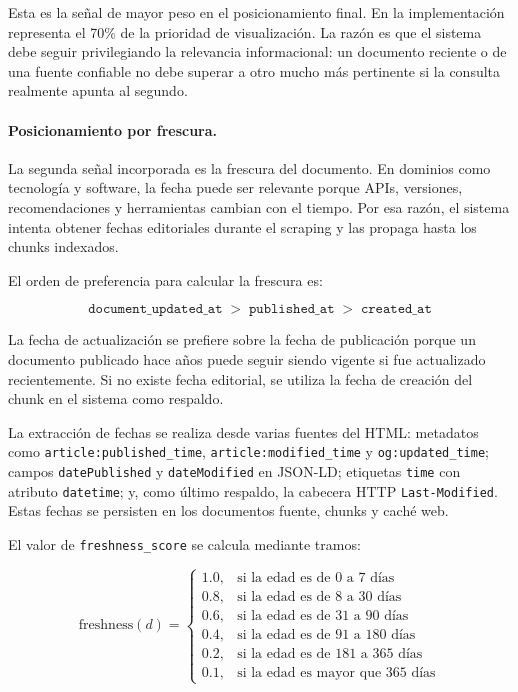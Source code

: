 \documentclass[11pt]{article}
\begin{document}
Esta es la señal de mayor peso en el posicionamiento final. En la implementación representa el
70\% de la prioridad de visualización. La razón es que el sistema debe seguir privilegiando la
relevancia informacional: un documento reciente o de una fuente confiable no debe superar a otro
mucho más pertinente si la consulta realmente apunta al segundo.

\paragraph{Posicionamiento por frescura.}
La segunda señal incorporada es la frescura del documento. En dominios como tecnología y
software, la fecha puede ser relevante porque APIs, versiones, recomendaciones y herramientas
cambian con el tiempo. Por esa razón, el sistema intenta obtener fechas editoriales durante el
scraping y las propaga hasta los chunks indexados.

El orden de preferencia para calcular la frescura es:

\[
\texttt{document\_updated\_at} \;>\; \texttt{published\_at} \;>\; \texttt{created\_at}
\]

La fecha de actualización se prefiere sobre la fecha de publicación porque un documento publicado
hace años puede seguir siendo vigente si fue actualizado recientemente. Si no existe fecha
editorial, se utiliza la fecha de creación del chunk en el sistema como respaldo.

La extracción de fechas se realiza desde varias fuentes del HTML: metadatos como
\texttt{article:published\_time}, \texttt{article:modified\_time} y
\texttt{og:updated\_time}; campos \texttt{datePublished} y \texttt{dateModified} en JSON-LD;
etiquetas \texttt{time} con atributo \texttt{datetime}; y, como último respaldo, la cabecera HTTP
\texttt{Last-Modified}. Estas fechas se persisten en los documentos fuente, chunks y caché web.

El valor de \texttt{freshness\_score} se calcula mediante tramos:

\[
\mathrm{freshness}(d)=
\begin{cases}
1.0, & \text{si la edad es de 0 a 7 días}\\
0.8, & \text{si la edad es de 8 a 30 días}\\
0.6, & \text{si la edad es de 31 a 90 días}\\
0.4, & \text{si la edad es de 91 a 180 días}\\
0.2, & \text{si la edad es de 181 a 365 días}\\
0.1, & \text{si la edad es mayor que 365 días}
\end{cases}
\]
\end{document}
